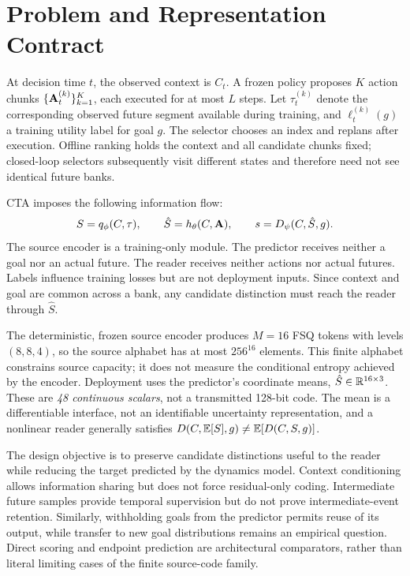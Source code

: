 \section{Problem and Representation Contract}
\label{sec:problem}
At decision time $t$, the observed context is $C_t$. A frozen policy proposes $K$ action chunks $\{\mathbf{A}_t^{(k)}\}_{k=1}^K$, each executed for at most $L$ steps. Let $\tau_t^{(k)}$ denote the corresponding observed future segment available during training, and $\ell_t^{(k)}(g)$ a training utility label for goal $g$. The selector chooses an index and replans after execution. Offline ranking holds the context and all candidate chunks fixed; closed-loop selectors subsequently visit different states and therefore need not see identical future banks.

CTA imposes the following information flow:
\begin{equation}
S=q_\phi(C,\tau),\qquad
\hat S=h_\theta(C,\mathbf{A}),\qquad
s=D_\psi(C,\hat S,g).
\label{eq:contract}
\end{equation}
The source encoder is a training-only module. The predictor receives neither a goal nor an actual future. The reader receives neither actions nor actual futures. Labels influence training losses but are not deployment inputs. Since context and goal are common across a bank, any candidate distinction must reach the reader through $\hat S$.

The deterministic, frozen source encoder produces $M=16$ FSQ tokens with levels $(8,8,4)$, so the source alphabet has at most $256^{16}$ elements. This finite alphabet constrains source capacity; it does not measure the conditional entropy achieved by the encoder. Deployment uses the predictor's coordinate means, $\hat S\in\mathbb{R}^{16\times3}$. These are \emph{48 continuous scalars}, not a transmitted 128-bit code. The mean is a differentiable interface, not an identifiable uncertainty representation, and a nonlinear reader generally satisfies $D(C,\mathbb{E}[S],g)\ne\mathbb{E}[D(C,S,g)]$.

The design objective is to preserve candidate distinctions useful to the reader while reducing the target predicted by the dynamics model. Context conditioning allows information sharing but does not force residual-only coding. Intermediate future samples provide temporal supervision but do not prove intermediate-event retention. Similarly, withholding goals from the predictor permits reuse of its output, while transfer to new goal distributions remains an empirical question. Direct scoring and endpoint prediction are architectural comparators, rather than literal limiting cases of the finite source-code family.
